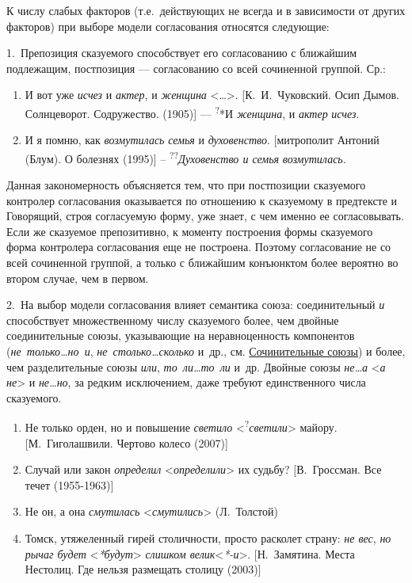К числу слабых факторов (т.е.~действующих не всегда и в зависимости от
других факторов) при выборе модели согласования относятся следующие:

1.~Препозиция сказуемого способствует его согласованию с ближайшим
подлежащим, постпозиция --- согласованию со всей сочиненной группой. Ср.:

\begin{enumerate}
\def\labelenumi{(\arabic{enumi})}
\setcounter{enumi}{99}
\item
  И вот уже \textit{исчез} и \textit{актер}, и \textit{женщина}
  \textless\ldots\textgreater. {[}К.~И.~Чуковский. Осип Дымов.
  Солнцеворот. Содружество. (1905){]} --- \textsuperscript{?}*И
  \textit{женщина}, и \textit{актер} \textit{исчез}.
\item
  И я помню, как \textit{возмутилась} \textit{семья} и \textit{духовенство}.
  {[}митрополит Антоний (Блум). О болезнях (1995){]} --
  \textsuperscript{??}\textit{Духовенство и семья} \textit{возмутилась}.
\end{enumerate}

Данная закономерность объясняется тем, что при постпозиции сказуемого
контролер согласования оказывается по отношению к сказуемому в
предтексте и Говорящий, строя согласуемую форму, уже знает, с чем именно
ее согласовывать. Если же сказуемое препозитивно, к моменту построения
формы сказуемого форма контролера согласования еще не построена. Поэтому
согласование не со всей сочиненной группой, а только с ближайшим
конъюнктом более вероятно во втором случае, чем в первом.

2.~На выбор модели согласования влияет семантика союза: соединительный
\textit{и} способствует множественному числу сказуемого более, чем двойные
соединительные союзы, указывающие на неравноценность компонентов
(\textit{не~только\ldots но~и}, \textit{не~столько\ldots сколько} и~др., см.
\underline{Сочинительные союзы}) и более, чем разделительные союзы
\textit{или}, \textit{то~ли\ldots то~ли} и~др. Двойные союзы
\textit{не\ldots а} \textless{}\textit{а не}\textgreater{} и
\textit{не\ldots но}, за редким исключением, даже требуют единственного
числа сказуемого.

\begin{enumerate}
\def\labelenumi{(\arabic{enumi})}
\setcounter{enumi}{101}
\item
  Не только орден, но и повышение \textit{светило}
  \textless{}\textsuperscript{?}\textit{светили}\textgreater{} майору.
  {[}М.~Гиголашвили. Чертово колесо (2007){]}
\item
  Случай или закон \textit{определил}
  \textless*\textit{определили}\textgreater{} их судьбу? {[}В.~Гроссман.
  Все течет (1955-1963){]}
\item
  Не он, а она \textit{смутилась} \textless*\textit{смутились}\textgreater{}
  (Л.~Толстой)
\item
  Томск, утяжеленный гирей столичности, просто расколет страну: \textit{не
  вес}, \textit{но рычаг будет} \textless{}\textit{*будут}\textgreater{}
  \textit{слишком велик}\textless{}\textit{*-и}\textgreater. {[}Н.~Замятина.
  Места Нестолиц. Где нельзя размещать столицу (2003){]}
\end{enumerate}

